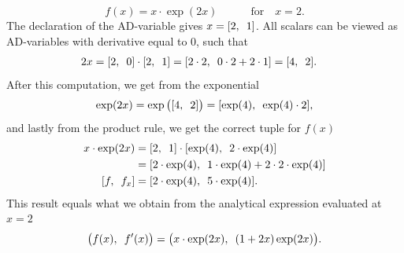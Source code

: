 \begin{equation}
    \label{eq:forwardADExample}
    f(x) = x\cdot\exp(2x) \hspace{3em} \text{for}\hspace{1em} x = 2.
\end{equation}
The declaration of the AD-variable gives $x = [2 ,\hspace{0.5em}  1]$. All scalars can be viewed as AD-variables with derivative equal to 0, such that
\begin{align*}
    2x &= [ \adpair{2}{0}  ]\cdot [ \adpair{2}{1} ] %
    =[ \adpair{2\cdot2}{0\cdot2 + 2\cdot 1}  ]%
    =[ \adpair{4}{2} ].
\end{align*}
After this computation, we get from the exponential
\begin{align*}
    \exp(2x) = \exp\big([ 4,\hspace{0.5em}2 ]\big)
    = [ \exp(4),\hspace{0.5em}\exp(4)\cdot 2 ],
\end{align*}
and lastly from the product rule, we get the correct tuple for $f(x)$
\begin{align*}
    x\cdot \exp(2x) &= [\adpair{2}{1}]\cdot [\adpair{\exp(4)}{2\cdot\exp(4)}]\\
    &=[\adpair{2\cdot\exp(4)}{1\cdot\exp(4) + 2\cdot 2\cdot\exp(4)}]\\
    [\adpair{f}{f_x}] & = [ \adpair{2\cdot\exp(4)}{5\cdot\exp(4)}].
\end{align*}
This result equals what we obtain from the analytical expression evaluated at $x=2$
\begin{equation*}
    \big(f(x),\hspace{0.5em}f'(x)\big) = \big(x\cdot\exp(2x),\hspace{0.5em}(1+2x)\exp(2x)\big).
\end{equation*}


